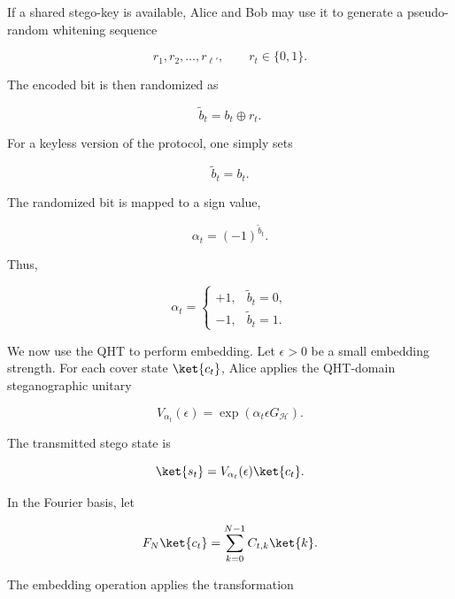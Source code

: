\documentclass[11pt]{article}
\theoremstyle{plain}
\theoremstyle{definition}
\theoremstyle{remark}
\begin{document}
If a shared stego-key is available, Alice and Bob may use it to generate a pseudo-random whitening sequence

\begin{equation}
r_1,r_2,\ldots,r_{\ell'},
\qquad
r_t\in\{0,1\}.
\end{equation}

The encoded bit is then randomized as

\begin{equation}
\widetilde{b}_t
=
b_t\oplus r_t.
\end{equation}

For a keyless version of the protocol, one simply sets

\begin{equation}
\widetilde{b}_t=b_t.
\end{equation}

The randomized bit is mapped to a sign value,

\begin{equation}
\alpha_t
=
(-1)^{\widetilde{b}_t}.
\end{equation}

Thus,

\begin{equation}
\alpha_t =
\begin{cases}
+1, & \widetilde{b}_t=0,\\
-1, & \widetilde{b}_t=1.
\end{cases}
\end{equation}

We now use the QHT to perform embedding. Let $\epsilon>0$ be a small embedding strength. For each cover state $\ket{c_t}$, Alice applies the QHT-domain steganographic unitary

\begin{equation}
V_{\alpha_t}(\epsilon)
=
\exp\left(
\alpha_t\epsilon G_{\mathcal H}
\right).
\end{equation}

The transmitted stego state is

\begin{equation}
\ket{s_t}
=
V_{\alpha_t}(\epsilon)\ket{c_t}.
\label{eq:stego-state}
\end{equation}

In the Fourier basis, let

\begin{equation}
F_N\ket{c_t}
=
\sum_{k=0}^{N-1}
C_{t,k}\ket{k}.
\end{equation}

The embedding operation applies the transformation
\end{document}
